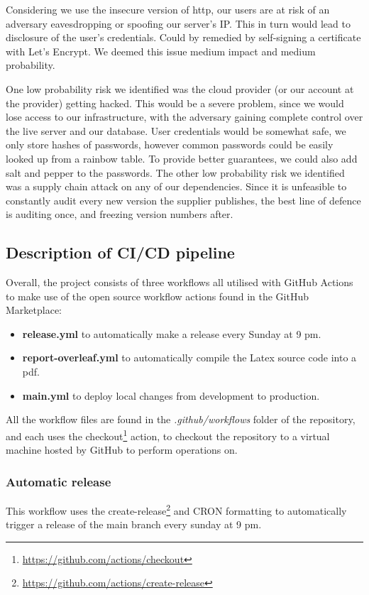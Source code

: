 \documentclass[report/main.tex]{subfiles}
\begin{document}
            Considering we use the insecure version of http, our users are at risk of an adversary eavesdropping or spoofing our server's IP. This in turn would lead to disclosure of the user's credentials. Could by remedied by self-signing a certificate with Let's Encrypt. We deemed this issue medium impact and medium probability.
        
            One low probability risk we identified was the cloud provider (or our account at the provider) getting hacked. This would be a severe problem, since we would lose access to our infrastructure, with the adversary gaining complete control over the live server and our database. User credentials would be somewhat safe, we only store hashes of passwords, however common passwords could be easily looked up from a rainbow table. To provide better guarantees, we could also add salt and pepper to the passwords.
            The other low probability risk we identified was a supply chain attack on any of our dependencies. Since it is unfeasible to constantly audit every new version the supplier publishes, the best line of defence is auditing once, and freezing version numbers after.
        
        \subsection{Description of CI/CD pipeline}
            Overall, the project consists of three workflows all utilised with GitHub Actions to make use of the open source workflow actions found in the GitHub Marketplace:
            \begin{itemize} 
                \item \textbf{release.yml} to automatically make a release every Sunday at 9 pm. 
                \item \textbf{report-overleaf.yml} to automatically compile the Latex source code into a pdf.
                \item \textbf{main.yml} to deploy local changes from development to production.
            \end{itemize}
            
            All the workflow files are found in the \textit{.github/workflows} folder of the repository, and each uses the checkout\footnote{\hyperlink{checkout action}{https://github.com/actions/checkout}} action, to checkout the repository to a virtual machine hosted by GitHub to perform operations on. 
        
            \subsubsection{Automatic release}
                This workflow uses the create-release\footnote{\hyperlink{release action}{https://github.com/actions/create-release}} and CRON formatting to automatically trigger a release of the main branch every sunday at 9 pm. 
        
\end{document}
